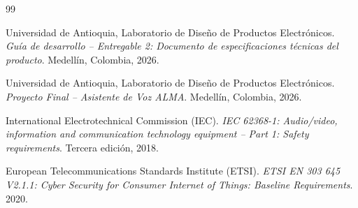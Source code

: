 \documentclass[%
	paper=a4,
	twoside=false,
	parskip=half,
	chapterprefix=false,
	10pt,
	headings=normal,
	bibliography=totoc,
	listof=totoc,
	titlepage=on,
	captions=tableabove,
	draft=false,
]{scrbook}%
\begin{document}
\begin{thebibliography}{99}

Universidad de Antioquia, Laboratorio de Diseño de Productos Electrónicos. \textit{Guía de desarrollo -- Entregable 2: Documento de especificaciones técnicas del producto}. Medellín, Colombia, 2026.

Universidad de Antioquia, Laboratorio de Diseño de Productos Electrónicos. \textit{Proyecto Final -- Asistente de Voz ALMA}. Medellín, Colombia, 2026.

International Electrotechnical Commission (IEC). \textit{IEC 62368-1: Audio/video, information and communication technology equipment -- Part 1: Safety requirements}. Tercera edición, 2018.

European Telecommunications Standards Institute (ETSI). \textit{ETSI EN 303 645 V2.1.1: Cyber Security for Consumer Internet of Things: Baseline Requirements}. 2020.

\end{thebibliography}
\end{document}
